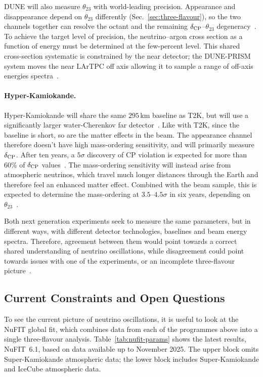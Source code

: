 DUNE will also measure $\theta_{23}$ with world-leading precision.
Appearance and disappearance depend on $\theta_{23}$ differently (Sec.~\ref{sec:three-flavour}), so the two channels together can resolve the octant and the remaining $\delta_{\rm CP}$--$\theta_{23}$ degeneracy~\citep[p.~3]{DUNE2025Science}.
To achieve the target level of precision, the neutrino--argon cross section as a function of energy must be determined at the few-percent level. This shared cross-section systematic is constrained by the near detector; the DUNE-PRISM system moves the near LArTPC off axis allowing it to sample a range of off-axis energies spectra~\cite{DUNE2025Science}.

\paragraph{Hyper-Kamiokande.}
Hyper-Kamiokande will share the same $295$\,km baseline as T2K, but will use a
significantly larger water-Cherenkov far detector~\cite{HyperK2025}.
Like with T2K, since the baseline is short, so are the matter effects in the beam.
The appearance channel therefore doesn't have high mass-ordering sensitivity, and
will primarily measure $\delta_{\rm CP}$. After ten years, a $5\sigma$ discovery of CP
violation is expected for more than $60\%$ of $\delta_{\rm CP}$ values~\cite{HyperK2025}.
The mass-ordering sensitivity will instead arise from atmospheric neutrinos, which
travel much longer distances through the Earth and therefore feel an enhanced matter
effect. Combined with the beam sample, this is expected to determine the mass-ordering
at $3.5$--$4.5\sigma$ in six years, depending on $\theta_{23}$~\cite{HyperK2025}. 

Both next generation experiments seek to measure the same parameters, but in different ways, with different detector technologies, baselines and beam energy spectra. Therefore, agreement between them would point towards a correct shared understanding of neutrino oscillations, while disagreement could point towards issues with one of the experiments, or an incomplete three-flavour picture~\citep[p.~3]{DUNE2025Science}.







\subsection{Current Constraints and Open Questions}
\label{sec:landscape-open}
To see the current picture of neutrino oscillations, it is useful to look at
the NuFIT global fit, which combines data from each of the programmes above
into a single three-flavour analysis.
Table~\ref{tab:nufit-params} shows the latest results, NuFIT~6.1, based on data
available up to November 2025.
The upper block omits Super-Kamiokande atmospheric data; the lower block
includes Super-Kamiokande and IceCube atmospheric data. 


